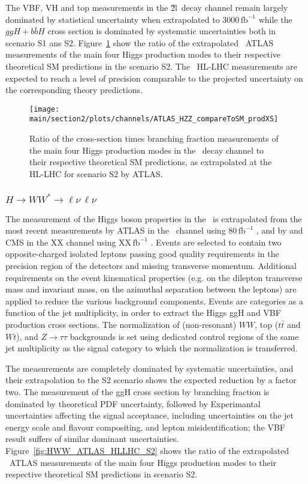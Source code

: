 The VBF, VH and top measurements in the \H2l\ decay channel remain largely dominated by statistical uncertainty when extrapolated to 3000\,$\mathrm{fb}^{-1}$ while the $ggH+b\bar{b}H$ cross section is dominated by systematic uncertainties both in scenario S1 ans S2.
%
Figure~\ref{fig:HZZ_ATLAS_HLLHC_S2} show the ratio of the extrapolated \HZZ\ ATLAS measurements of the main four Higgs production modes to their respective theoretical SM predictions in the scenario S2. The  \HZZ\ HL-LHC measurements are expected to  reach a level of precision comparable to the projected uncertainty on the corresponding theory predictions.

\begin{figure}
  \centering
  \texttt{[image: \\main/section2/plots/channels/ATLAS\_HZZ\_compareToSM\_prodXS]}
  \caption{Ratio of the cross-section times branching fraction measurements of the main four Higgs production modes in the \HZZ\ decay channel to their respective theoretical SM predictions, as extrapolated at the HL-LHC for scenario S2 by ATLAS.}
  \label{fig:HZZ_ATLAS_HLLHC_S2}
\end{figure}

\subsubsection{$H \to WW^* \to \ell\nu\,\ell\nu$}

The measurement of the Higgs boson properties in the \HZZ\ is extrapolated from the most recent measurements by ATLAS in the \HWW\ channel using 80\,$\mathrm{fb}^{-1}$ \cite{Aaboud:2018jqu}, and by and CMS in the XX channel using XX\,$\mathrm{fb}^{-1}$ \cite{}.
Events are selected to contain two opposite-charged isolated leptons passing good quality requirements in the precision region of the detectors and missing transverse momentum. Additional requirements on the event kinematical properties (e.g. on the dilepton transverse mass and invariant mass, on the azimuthal separation between the leptons) are applied to reduce the various background components. Events are categories as a function of the jet multiplicity, in order to extract the Higgs ggH and VBF production cross sections. The normalization of (non-resonant) $WW$, top ($t\bar{t}$ and $Wt$), and $Z\rightarrow\tau\tau$ backgrounds is set using dedicated control regions of the same jet multiplicity as the signal category to which the normalization is transferred.

The measurements are completely dominated by systematic uncertainties, and their extrapolation to the S2 scenario shows the expected reduction by a factor two. The measurement of the ggH cross section by branching fraction is dominated by theoretical PDF uncertainty, followed by Experimantal uncertainties affecting the signal acceptance, including uncertainties on the jet energy scale and flavour compositing, and lepton misidentification; the VBF result suffers of similar dominant uncertainties.
Figure~\ref{fig:HWW_ATLAS_HLLHC_S2} shows the ratio of the extrapolated \HWW\ ATLAS measurements of the main four Higgs production modes to their respective theoretical SM predictions in scenario S2.

